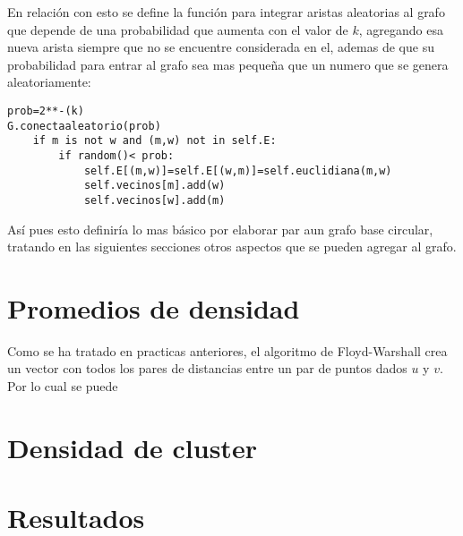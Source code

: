 \documentclass[12pt]{article}
\begin{document}
En relación con esto se define la función para integrar aristas aleatorias al grafo que depende de una probabilidad que aumenta con el valor de $k$, agregando esa nueva arista siempre que no se encuentre considerada en el, ademas de que su probabilidad para entrar al grafo sea mas pequeña que un numero que se genera aleatoriamente:
\begin{lstlisting}[style=tt]
prob=2**-(k)
G.conectaaleatorio(prob)
	if m is not w and (m,w) not in self.E:
		if random()< prob:
			self.E[(m,w)]=self.E[(w,m)]=self.euclidiana(m,w)
			self.vecinos[m].add(w)
			self.vecinos[w].add(m)
\end{lstlisting}
Así pues esto definiría lo mas básico por elaborar par aun grafo base circular, tratando en las siguientes secciones otros aspectos que se pueden agregar al grafo.
\section{Promedios de densidad}
Como se ha tratado en practicas anteriores, el algoritmo de Floyd-Warshall crea un vector con todos los pares de distancias entre un par de puntos dados $u$ y $v$.\\
Por lo cual se puede 
\section{Densidad de cluster}
\section{Resultados}
\end{document}
